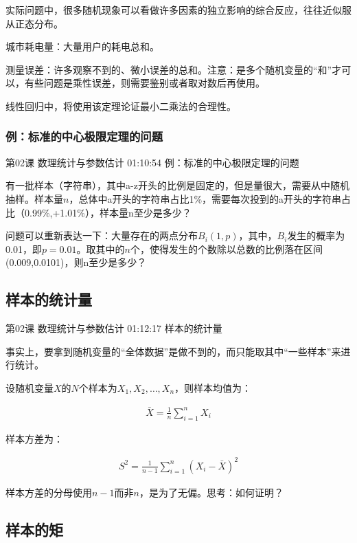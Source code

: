 \documentclass[UTF8]{ctexart}
\begin{document}
实际问题中，很多随机现象可以看做许多因素的独立影响的综合反应，往往近似服从正态分布。

城市耗电量：大量用户的耗电总和。

测量误差：许多观察不到的、微小误差的总和。注意：是多个随机变量的“和”才可以，有些问题是乘性误差，则需要鉴别或者取对数后再使用。

线性回归中，将使用该定理论证最小二乘法的合理性。

\subsubsection{例：标准的中心极限定理的问题}

第02课 数理统计与参数估计 01:10:54 例：标准的中心极限定理的问题

有一批样本（字符串），其中a-z开头的比例是固定的，但是量很大，需要从中随机抽样。样本量$n$，总体中a开头的字符串占比1\%，需要每次投到的a开头的字符串占比（0.99\%,+1.01\%），样本量n至少是多少？

问题可以重新表达一下：大量存在的两点分布$B_{i}(1,p)$，其中，$B_{i}$发生的概率为0.01，即$p=0.01$。取其中的$n$个，使得发生的个数除以总数的比例落在区间(0.009,0.0101)，则n至少是多少？

\subsection{样本的统计量}

第02课 数理统计与参数估计 01:12:17 样本的统计量

事实上，要拿到随机变量的“全体数据”是做不到的，而只能取其中“一些样本”来进行统计。

设随机变量$X$的$N$个样本为$X_{1},X_{2},\dots,X_{n}$，则样本均值为：

\begin{equation}
\begin{aligned}
\bar{X}=\frac{1}{n}\sum_{i=1}^{n}X_{i}
\end{aligned}
\end{equation}

样本方差为：

\begin{equation}
\begin{aligned}
S^{2}=\frac{1}{n-1}\sum_{i=1}^{n}(X_{i}-\bar{X})^{2}
\end{aligned}
\end{equation}

样本方差的分母使用$n-1$而非$n$，是为了无偏。思考：如何证明？

\subsection{样本的矩}
\end{document}
